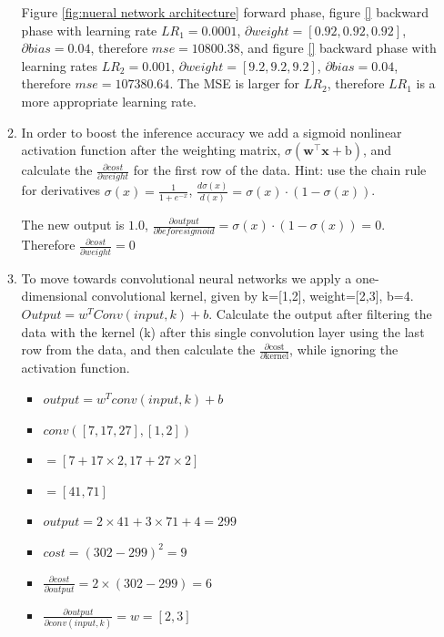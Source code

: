\documentclass[main.tex]{subfiles}
\begin{document}
\begin{enumerate}
\begin{enumerate}
        Figure \ref{fig:nueral network architecture} forward phase, figure \ref{} backward phase with learning rate $LR_1=0.0001$, $\partial weight = [0.92,0.92,0.92]$, $\partial bias = 0.04$, therefore $mse = 10800.38$, and figure \ref{} backward phase with learning rates $LR_2=0.001$, $\partial weight = [9.2,9.2,9.2]$, $\partial bias = 0.04$, therefore $mse = 107380.64$. The MSE is larger for $LR_2$, therefore $LR_1$ is a more appropriate learning rate.
        
        \item In order to boost the inference accuracy we add a sigmoid nonlinear activation function after the weighting matrix, $\sigma\left(\boldsymbol{w}^{\top} \boldsymbol{x}+\mathrm{b}\right)$, and calculate the $\frac{\partial cost}{\partial weight}$ for the first row of the data. Hint: use the chain rule for derivatives $\sigma(x)=\frac{1}{1+e^{-x}}$, $\frac{d \sigma(x)}{d(x)}=\sigma(x) \cdot(1-\sigma(x))$.
        
        The new output is $1.0$, $\frac{\partial output}{\partial before sigmoid} = \sigma(x)\cdot(1-\sigma(x)) = 0$. Therefore $\frac{\partial cost}{\partial weight} = 0$
        
        \item To move towards convolutional neural networks we apply a one-dimensional convolutional kernel, given by k=[1,2], weight=[2,3], b=4. $Output = w^T Conv(input,k)+b$. Calculate the output after filtering the data with the kernel (k) after this single convolution layer using the last row from the data, and then calculate the $\frac{\partial \text{cost}}{\partial \text{kernel}}$, while ignoring the activation function.
        
        \begin{itemize}[label={}]
            \item $output = w^T conv(input,k)+b$
            \item $conv([7,17,27],[1,2])$
            \item $=[7+17\times2, 17+27\times2]$
            \item $=[41, 71]$
            \item $output = 2\times41+3\times71+4=299$
            \item $cost = (302-299)^2 = 9$
            \item $\frac{\partial cost}{\partial output} = 2 \times (302-299) = 6$
            \item $\frac{\partial output}{\partial conv (input,k)} = w = [2,3]$
        \end{itemize}
        

\end{enumerate}
\end{enumerate}
\end{document}

